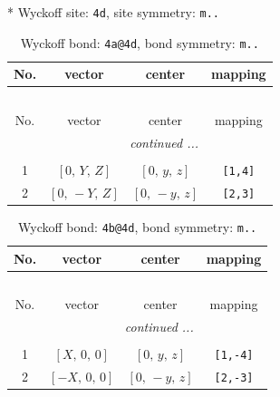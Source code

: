\documentclass[fleqn,8pt]{jsarticle}
\begin{document}
* Wyckoff site: {\tt 4d}, site symmetry: {\tt m..}
\renewcommand{\arraystretch}{1.2}
\begin{longtable}{cccc}
\caption{Wyckoff bond: {\tt 4a@4d}, bond symmetry: {\tt m..}}
 \\
 \hline \hline
No. & vector & center & mapping \\ \hline \endfirsthead

\multicolumn{3}{l}{\tablename\ \thetable{}} \\
 \hline \hline
No. & vector & center & mapping \\ \hline \endhead

 \hline \hline
\multicolumn{3}{r}{\footnotesize\it continued ...} \\ \endfoot

 \hline \hline
\multicolumn{3}{r}{} \\ \endlastfoot

1 & $\left[ 0,\, Y,\, Z \right]$ & $\left[ 0,\, y,\, z \right]$ & {\tt [1,4]} \\ \hline
2 & $\left[ 0,\, - Y,\, Z \right]$ & $\left[ 0,\, - y,\, z \right]$ & {\tt [2,3]} \\
\end{longtable}
\renewcommand{\arraystretch}{1.2}
\begin{longtable}{cccc}
\caption{Wyckoff bond: {\tt 4b@4d}, bond symmetry: {\tt m..}}
 \\
 \hline \hline
No. & vector & center & mapping \\ \hline \endfirsthead

\multicolumn{3}{l}{\tablename\ \thetable{}} \\
 \hline \hline
No. & vector & center & mapping \\ \hline \endhead

 \hline \hline
\multicolumn{3}{r}{\footnotesize\it continued ...} \\ \endfoot

 \hline \hline
\multicolumn{3}{r}{} \\ \endlastfoot

1 & $\left[ X,\, 0,\, 0 \right]$ & $\left[ 0,\, y,\, z \right]$ & {\tt [1,-4]} \\ \hline
2 & $\left[ - X,\, 0,\, 0 \right]$ & $\left[ 0,\, - y,\, z \right]$ & {\tt [2,-3]} \\
\end{longtable}
\renewcommand{\arraystretch}{1.2}
\end{document}
